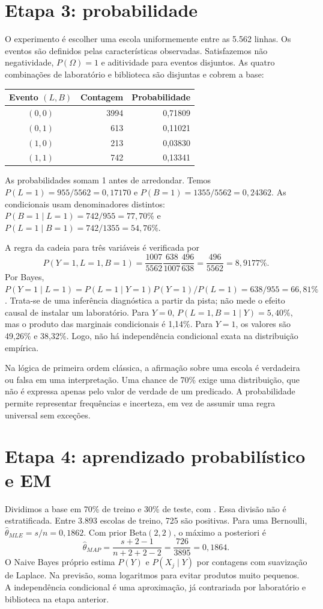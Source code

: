 \documentclass[10pt,a4paper]{article}
\newcommand{\cod}[1]{\texttt{\detokenize{#1}}}
\begin{document}
\newpage
\section{Etapa 3: probabilidade}
O experimento é escolher uma escola uniformemente entre as 5.562 linhas. Os eventos são definidos pelas características observadas. Satisfazemos não negatividade, $P(\Omega)=1$ e aditividade para eventos disjuntos. As quatro combinações de laboratório e biblioteca são disjuntas e cobrem a base:
\begin{center}\small
\begin{tabular}{crr}\toprule
Evento $(L,B)$ & Contagem & Probabilidade\\\midrule
$(0,0)$ & 3994 & 0,71809\\
$(0,1)$ & 613 & 0,11021\\
$(1,0)$ & 213 & 0,03830\\
$(1,1)$ & 742 & 0,13341\\\bottomrule
\end{tabular}\end{center}
As probabilidades somam 1 antes de arredondar. Temos $P(L=1)=955/5562=0,17170$ e $P(B=1)=1355/5562=0,24362$. As condicionais usam denominadores distintos: $P(B=1\mid L=1)=742/955=77,70\%$ e $P(L=1\mid B=1)=742/1355=54,76\%$.

A regra da cadeia para três variáveis é verificada por
\[
P(Y=1,L=1,B=1)=\frac{1007}{5562}\frac{638}{1007}\frac{496}{638}
=\frac{496}{5562}=8,9177\%.
\]
Por Bayes, $P(Y=1\mid L=1)=P(L=1\mid Y=1)P(Y=1)/P(L=1)=638/955=66,81\%$. Trata-se de uma inferência diagnóstica a partir da pista; não mede o efeito causal de instalar um laboratório. Para $Y=0$, $P(L=1,B=1\mid Y)=5,40\%$, mas o produto das marginais condicionais é 1,14\%. Para $Y=1$, os valores são 49,26\% e 38,32\%. Logo, não há independência condicional exata na distribuição empírica.

Na lógica de primeira ordem clássica, a afirmação sobre uma escola é verdadeira ou falsa em uma interpretação. Uma chance de 70\% exige uma distribuição, que não é expressa apenas pelo valor de verdade de um predicado. A probabilidade permite representar frequências e incerteza, em vez de assumir uma regra universal sem exceções.

\section{Etapa 4: aprendizado probabilístico e EM}
Dividimos a base em 70\% de treino e 30\% de teste, com \cod{random_state=42}. Essa divisão não é estratificada. Entre 3.893 escolas de treino, 725 são positivas. Para uma Bernoulli, $\hat\theta_{MLE}=s/n=0,1862$. Com prior Beta$(2,2)$, o máximo a posteriori é
\[
\hat\theta_{MAP}=\frac{s+2-1}{n+2+2-2}=\frac{726}{3895}=0,1864.
\]
O Naive Bayes próprio estima $P(Y)$ e $P(X_j\mid Y)$ por contagens com suavização de Laplace. Na previsão, soma logaritmos para evitar produtos muito pequenos. A independência condicional é uma aproximação, já contrariada por laboratório e biblioteca na etapa anterior.
\end{document}
